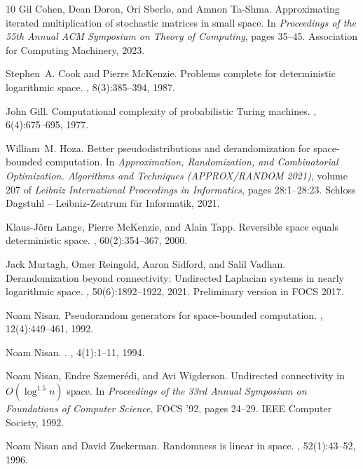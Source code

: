 \documentclass[11pt]{article}
\numberwithin{equation}{section}
\theoremstyle{definition}
\theoremstyle{remark}
\begin{document}
\begin{thebibliography}{10}
Gil Cohen, Dean Doron, Ori Sberlo, and Amnon Ta-Shma.
\newblock Approximating iterated multiplication of stochastic matrices in small
  space.
\newblock In {\em Proceedings of the 55th Annual ACM Symposium on Theory of
  Computing}, pages 35--45. Association for Computing Machinery, 2023.

Stephen~A. Cook and Pierre McKenzie.
\newblock Problems complete for deterministic logarithmic space.
, 8(3):385--394, 1987.

John Gill.
\newblock Computational complexity of probabilistic {Turing} machines.
, 6(4):675--695, 1977.

William~M. Hoza.
\newblock Better pseudodistributions and derandomization for space-bounded
  computation.
\newblock In {\em Approximation, Randomization, and Combinatorial Optimization.
  Algorithms and Techniques (APPROX/RANDOM 2021)}, volume 207 of {\em Leibniz
  International Proceedings in Informatics}, pages 28:1--28:23. Schloss
  Dagstuhl -- Leibniz-Zentrum f{\"u}r Informatik, 2021.

Klaus-J{\"o}rn Lange, Pierre McKenzie, and Alain Tapp.
\newblock Reversible space equals deterministic space.
, 60(2):354--367, 2000.

Jack Murtagh, Omer Reingold, Aaron Sidford, and Salil Vadhan.
\newblock Derandomization beyond connectivity: Undirected {Laplacian} systems
  in nearly logarithmic space.
, 50(6):1892--1922, 2021.
\newblock Preliminary version in FOCS 2017.

Noam Nisan.
\newblock Pseudorandom generators for space-bounded computation.
, 12(4):449--461, 1992.

Noam Nisan.
.
, 4(1):1--11, 1994.

Noam Nisan, Endre Szemer{\'e}di, and Avi Wigderson.
\newblock Undirected connectivity in {$O(\log^{1.5} n)$} space.
\newblock In {\em Proceedings of the 33rd Annual Symposium on Foundations of
  Computer Science}, FOCS '92, pages 24--29. IEEE Computer Society, 1992.

Noam Nisan and David Zuckerman.
\newblock Randomness is linear in space.
, 52(1):43--52, 1996.


\end{thebibliography}
\end{document}
